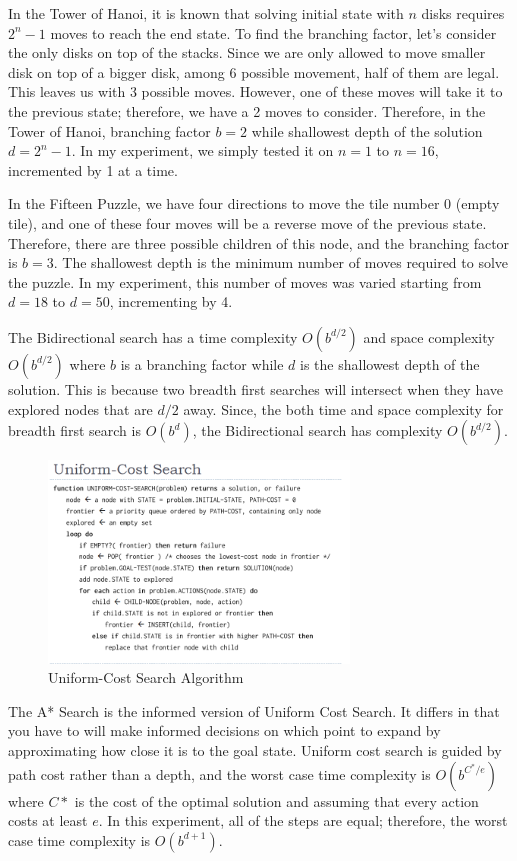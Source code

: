 \documentclass[conference]{IEEEtran}
\begin{document}
In the Tower of Hanoi, it is known that solving initial state with $n$ disks requires $2^n - 1$ moves to reach the end state. To find the branching factor, let's consider the only disks on top of the stacks. Since we are only allowed to move smaller disk on top of a bigger disk, among 6 possible movement, half of them are legal. This leaves us with 3 possible moves. However, one of these moves will take it to the previous state; therefore, we have a 2 moves to consider. Therefore, in the Tower of Hanoi, branching factor $b = 2$ while shallowest depth of the solution $d = 2^n - 1$. In my experiment, we simply tested it on $n = 1$ to $n = 16$, incremented by 1 at a time.

In the Fifteen Puzzle, we have four directions to move the tile number 0 (empty tile), and one of these four moves will be a reverse move of the previous state. Therefore, there are three possible children of this node, and the branching factor is $b = 3$. The shallowest depth is the minimum number of moves required to solve the puzzle. In my experiment, this number of moves was varied starting from $d = 18$ to $d = 50$, incrementing by 4.

The Bidirectional search has a time complexity $O(b^{d/2})$ and space complexity $O(b^{d/2})$ where $b$ is a branching factor while $d$ is the shallowest depth of the solution. This is because two breadth first searches will intersect when they have explored nodes that are $d/2$ away. Since, the both time and space complexity for breadth first search is $O(b^d)$, the Bidirectional search has complexity $O(b^{d/2})$. 


\begin{figure}[!t]
\includegraphics[width=8cm]{uniform_cost}
\centering
\caption{Uniform-Cost Search Algorithm}
\end{figure}

The A* Search is the informed version of Uniform Cost Search. It differs in that you have to will make informed decisions on which point to expand by approximating how close it is to the goal state. Uniform cost search is guided by path cost rather than a depth, and the worst case time complexity is $O(b^{C^*/e})$ where $C*$ is the cost of the optimal solution and assuming that every action costs at least $e$. In this experiment, all of the steps are equal; therefore, the worst case time complexity is $O(b^{d+1})$.
\end{document}
